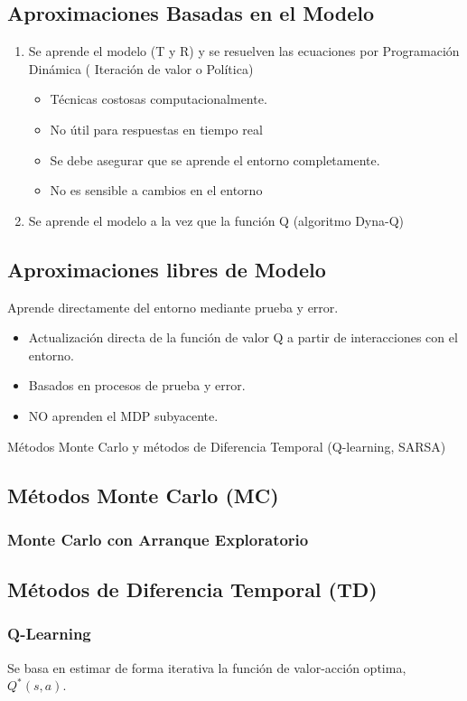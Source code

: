 \documentclass[12pt]{report} %
\begin{document}
\subsection{Aproximaciones Basadas en el Modelo}
\begin{enumerate}
  \item Se aprende el modelo (T y R) y se resuelven las ecuaciones por Programación Dinámica ( Iteración de valor o Política)
  \begin{itemize}
    \item Técnicas costosas computacionalmente.
    \item No útil para respuestas en tiempo real
    \item Se debe asegurar que se aprende el entorno completamente.
    \item No es sensible a cambios en el entorno 
  \end{itemize}
  \item Se aprende el modelo a la vez que la función Q (algoritmo Dyna-Q)
\end{enumerate}

\subsection{Aproximaciones libres de Modelo}
Aprende directamente del entorno mediante prueba y error.
\begin{itemize}
  \item Actualización directa de la función de valor Q a partir de interacciones con el entorno.
  \item Basados en procesos de prueba y error.
  \item NO aprenden el MDP subyacente.
\end{itemize}
Métodos Monte Carlo y métodos de Diferencia Temporal (Q-learning, SARSA)

\subsection{Métodos Monte Carlo (MC)}
\subsubsection{Monte Carlo con Arranque Exploratorio}

\subsection{Métodos de Diferencia Temporal (TD)}
\subsubsection{Q-Learning}
Se basa en estimar de forma iterativa la función de valor-acción optima, $Q^*(s,a)$. 
\end{document}
